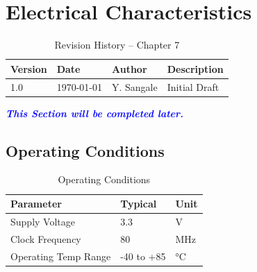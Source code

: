 \chapter{Electrical Characteristics}

\begin{table}[H]
\caption{Revision History – Chapter 7}
\centering
\begin{tabular}{llll}
\toprule
Version & Date & Author & Description \\
\midrule
1.0 & \today & Y. Sangale & Initial Draft \\
\bottomrule
\end{tabular}
\end{table}

\textcolor{blue}{\textbf{\textit{This Section will be completed later.}}}

\section{Operating Conditions}
\begin{table}[H]
\centering
\caption{Operating Conditions}
\begin{tabular}{lll}
\toprule
Parameter & Typical & Unit \\
\midrule
Supply Voltage & 3.3 & V \\
Clock Frequency & 80 & MHz \\
Operating Temp Range & -40 to +85 & °C \\
\bottomrule
\end{tabular}
\end{table}
